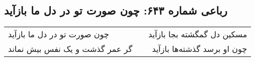 \begin{center}
\section*{رباعی شماره ۶۴۳: چون صورت تو در دل ما بازآید}
\label{sec:0643}
\begin{longtable}{l p{0.5cm} r}
چون صورت تو در دل ما بازآید
&&
مسکین دل گمگشته بجا بازآید
\\
گر عمر گذشت و یک نفس بیش نماند
&&
چون او برسد گذشته‌ها بازآید
\\
\end{longtable}
\end{center}
